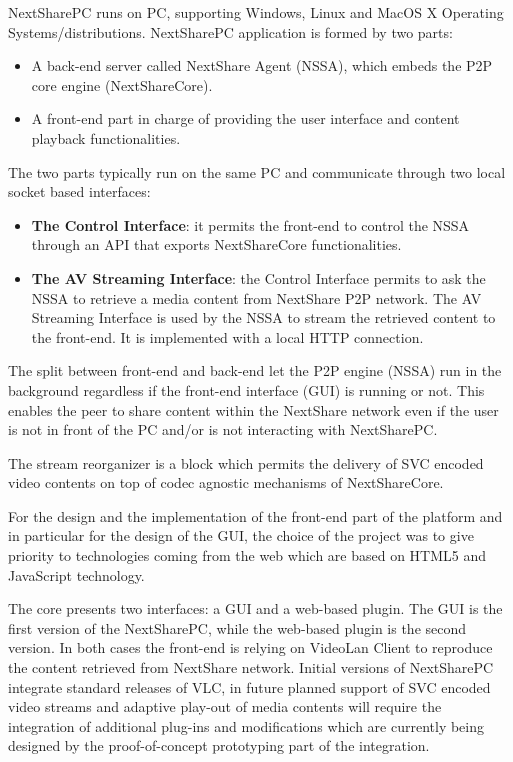 NextSharePC runs on PC, supporting Windows, Linux and MacOS X Operating
Systems/distributions. NextSharePC application is formed by two parts:
\begin{itemize}
  \item A back-end server called NextShare Agent (NSSA), which embeds the P2P
  core engine (NextShareCore).
  \item A front-end part in charge of providing the user interface and content
  playback functionalities.
\end{itemize}

The two parts typically run on the same PC and communicate through two local
socket based interfaces:
\begin{itemize}
  \item \textbf{The Control Interface}: it permits the front-end to control
  the NSSA through an API that exports NextShareCore functionalities.
  \item \textbf{The AV Streaming Interface}: the Control Interface permits to
  ask the NSSA to retrieve a media content from NextShare P2P network. The AV
  Streaming Interface is used by the NSSA to stream the retrieved content to
  the front-end. It is implemented with a local HTTP connection.
\end{itemize}

The split between front-end and back-end let the P2P engine (NSSA) run in the
background regardless if the front-end interface (GUI) is running or not. This
enables the peer to share content within the NextShare network even if the
user is not in front of the PC and/or is not interacting with NextSharePC.

The stream reorganizer is a block which permits the delivery of SVC encoded
video contents on top of codec agnostic mechanisms of NextShareCore.

For the design and the implementation of the front-end part of the platform
and in particular for the design of the GUI, the choice of the project was to
give priority to technologies coming from the web which are based on HTML5 and
JavaScript technology.

The core presents two interfaces: a GUI and a web-based plugin. The GUI is the
first version of the NextSharePC, while the web-based plugin is the second
version. In both cases the front-end is relying on VideoLan Client to
reproduce the content retrieved from NextShare network. Initial versions of
NextSharePC integrate standard releases of VLC, in future planned support of
SVC encoded video streams and adaptive play-out of media contents will require
the integration of additional plug-ins and modifications which are currently
being designed by the proof-of-concept prototyping part of the integration.

